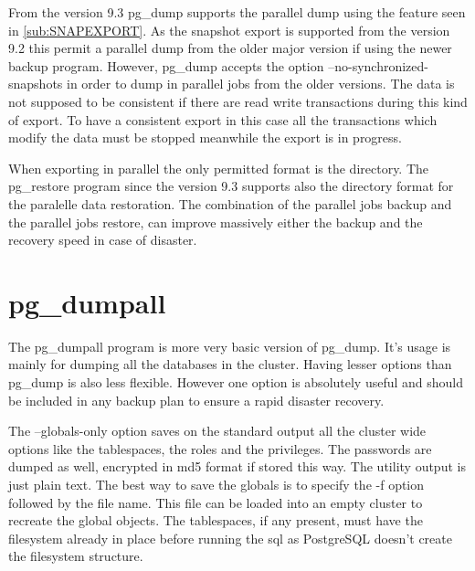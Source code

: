 From the version 9.3 pg\_dump supports the parallel dump using the feature seen in  
\ref{sub:SNAPEXPORT}. As the snapshot export is supported from the version 9.2 this permit a 
parallel dump from the older major version if using the newer backup program. However, 
pg\_dump accepts the option --no-synchronized-snapshots in order to dump in parallel jobs 
from the older versions. The data is not supposed to be consistent if there are  read write 
transactions during this kind of export. To have a consistent export in this case all the 
transactions which modify the data must be stopped meanwhile the export is in progress.\newline 

When exporting in parallel the only permitted format is the directory. The pg\_restore program 
since the version 9.3 supports also the directory format for the paralelle data restoration.
The combination of the parallel jobs backup and the parallel jobs restore, can improve massively 
either the backup and the recovery speed in case of disaster.

\section{pg\_dumpall}
The pg\_dumpall program is more very basic version of pg\_dump. It's usage is mainly for 
dumping all the databases in the cluster. Having lesser options than pg\_dump is also less 
flexible. However one option is absolutely useful and should be included in any backup plan to 
ensure a rapid disaster recovery.\newline

The --globals-only option saves on the standard output all the 
cluster wide options like the tablespaces, the roles and the privileges. The passwords are dumped as 
well, encrypted in md5 format if stored this way. The utility output is just plain text. 
The best way to save the globals is to specify the -f option followed by the file name. This file 
can be loaded into an empty cluster to recreate the global objects. The tablespaces, if any present, 
must have the filesystem already in place before running the sql as PostgreSQL doesn't create the 
filesystem structure.\newline

